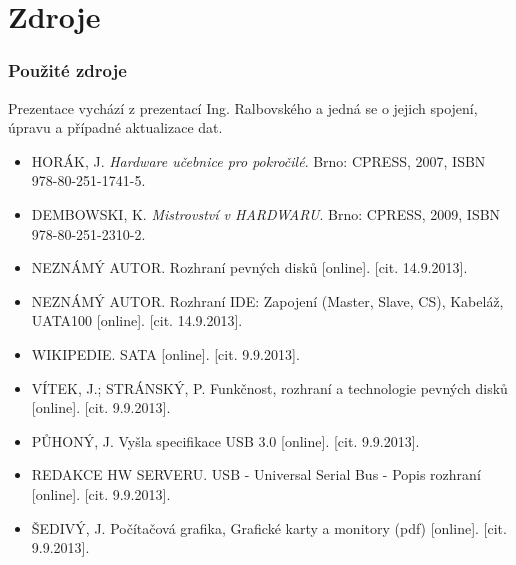 \documentclass[aspectratio=43]{beamer}
\begin{document}
\section{Zdroje}
\begin{frame}
	\frametitle{Použité zdroje}
	Prezentace vychází z prezentací Ing. Ralbovského a jedná se o jejich spojení, úpravu a případné aktualizace dat.
	
	\scriptsize
	\begin{itemize}
		\item HORÁK, J. \textit{Hardware učebnice pro pokročilé}. Brno: CPRESS, 2007, ISBN 978-80-251-1741-5.
		      
		\item DEMBOWSKI, K. \textit{Mistrovství v HARDWARU}. Brno: CPRESS, 2009, ISBN 978-80-251-2310-2.
		      
		\item NEZNÁMÝ AUTOR. Rozhraní pevných disků [online]. [cit. 14.9.2013].
		      
		\item NEZNÁMÝ AUTOR. Rozhraní IDE: Zapojení (Master, Slave, CS), Kabeláž, UATA100 [online]. [cit. 14.9.2013].
		      
		\item WIKIPEDIE. SATA [online]. [cit. 9.9.2013].
		      
		\item VÍTEK, J.; STRÁNSKÝ, P. Funkčnost, rozhraní a technologie pevných disků [online]. [cit. 9.9.2013].
		      
		\item PŮHONÝ, J. Vyšla specifikace USB 3.0 [online]. [cit. 9.9.2013].
		      
		\item REDAKCE HW SERVERU. USB - Universal Serial Bus - Popis rozhraní [online]. [cit. 9.9.2013].
		      
		\item ŠEDIVÝ, J. Počítačová grafika, Grafické karty a monitory (pdf) [online]. [cit. 9.9.2013].
	\end{itemize}
	
\end{frame}
\end{document}
